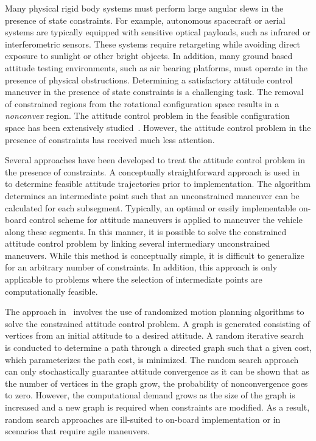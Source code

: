 Many physical rigid body systems must perform large angular slews in the presence of state constraints.
For example, autonomous spacecraft or aerial systems are typically equipped with sensitive optical payloads, such as infrared or interferometric sensors.
These systems require retargeting while avoiding direct exposure to sunlight or other bright objects.
In addition, many ground based attitude testing environments, such as air bearing platforms, must operate in the presence of physical obstructions.
Determining a satisfactory attitude control maneuver in the presence of state constraints is a challenging task.
The removal of constrained regions from the rotational configuration space results in a \textit{nonconvex} region.
The attitude control problem in the feasible configuration space has been extensively studied~\cite{bullo2004,MayTeePaCC11,LEEITAC15}.
However, the attitude control problem in the presence of constraints has received much less attention.

Several approaches have been developed to treat the attitude control problem in the presence of constraints.
A conceptually straightforward approach is used in~\cite{hablani1999} to determine feasible attitude trajectories prior to implementation.
The algorithm determines an intermediate point such that an unconstrained maneuver can be calculated for each subsegment.
Typically, an optimal or easily implementable on-board control scheme for attitude maneuvers is applied to maneuver the vehicle along these segments.
In this manner, it is possible to solve the constrained attitude control problem by linking several intermediary unconstrained maneuvers.
While this method is conceptually simple, it is difficult to generalize for an arbitrary number of constraints.
In addition, this approach is only applicable to problems where the selection of intermediate points are computationally feasible.

The approach in~\cite{frazzoli2001} involves the use of randomized motion planning algorithms to solve the constrained attitude control problem.
A graph is generated consisting of vertices from an initial attitude to a desired attitude. 
A random iterative search is conducted to determine a path through a directed graph such that a given cost, which parameterizes the path cost, is minimized.
The random search approach can only stochastically guarantee attitude convergence as it can be shown that as the number of vertices in the graph grow, the probability of nonconvergence goes to zero.
However, the computational demand grows as the size of the graph is increased and a new graph is required when constraints are modified. 
As a result, random search approaches are ill-suited to on-board implementation or in scenarios that require agile maneuvers.

